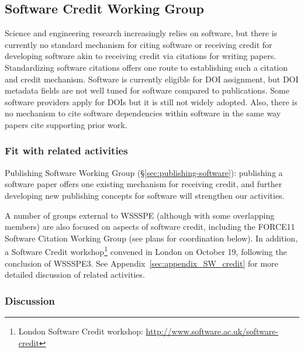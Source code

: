\subsection{Software Credit Working Group}
\label{sec:software-credit}


Science and engineering research increasingly relies on software, but there is currently no standard mechanism for citing software or receiving credit for developing software akin to receiving credit via citations for writing papers.
Standardizing software citations offers one route to establishing such a citation and credit mechanism.
Software is currently eligible for DOI assignment, but DOI metadata fields are not well tuned for software compared to publications. 
Some software providers apply for DOIs but it is still not widely adopted. 
Also, there is no mechanism to cite software dependencies within software in the same way papers cite supporting prior work.

\subsubsection{Fit with related activities}

Publishing Software Working Group (\S\ref{sec:publishing-software}): publishing a software paper offers one existing mechanism for receiving credit, and further developing new publishing concepts for software will strengthen our activities.

A number of groups external to WSSSPE (although with some overlapping members) are also focused on aspects of software credit, including the FORCE11 Software Citation Working Group (see plans for coordination below).
In addition, a Software Credit workshop\footnote{London Software Credit workshop: \url{http://www.software.ac.uk/software-credit}} convened in London on October 19, following the conclusion of WSSSPE3.
See Appendix~\ref{sec:appendix_SW_credit} for more detailed discussion of related activities.

\subsubsection{Discussion}

